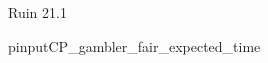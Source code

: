 \documentclass[handout]{mcs}
\begin{document}


\begin{staffnotes}
 Ruin 21.1
\end{staffnotes}


\begin{staffnotes}
pinput{CP\_gambler\_fair\_expected\_time}
\end{staffnotes}

\end{document}

